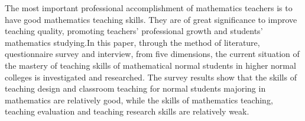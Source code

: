 \documentclass{CCNUthesis}
\begin{document}



\frontmatter


\tableofcontents


\begin{abstract}
  数学教师最重要的职业素养是具备良好的数学教学技能，它关系到教学质量的提高、教师专业的发展和学生的数学学习。本研究从五个维度对高等师范学院数学专业师范生的教学技能掌握现状开展调查研究。调查结果表明，数学专业师范生的教学设计和课堂教学技能相对较强，而数学说课、教学评价和教学研究技能则较为薄弱。
\end{abstract}

\begin{abstract*}
  The most important professional accomplishment of mathematics teachers is to have good mathematics teaching skills. They are of great significance to improve teaching quality, promoting teachers' professional growth and students' mathematics studying.In this paper, through the method of literature, questionnaire survey and interview, from five dimensions, the current situation of the mastery of teaching skills of mathematical normal students in higher normal colleges is investigated and researched. The survey results show that the skills of teaching design and classroom teaching  for  normal students majoring in mathematics are relatively good, while the skills of mathematics teaching, teaching evaluation and teaching research skills are relatively weak.
\end{abstract*}


\end{document}
